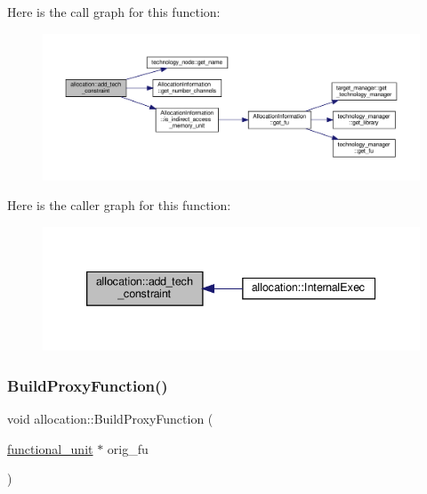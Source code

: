 Here is the call graph for this function\+:
\nopagebreak
\begin{figure}[H]
\begin{center}
\leavevmode
\includegraphics[width=350pt]{d0/d74/classallocation_a8896615bea432f94fc39ba9eb56f410c_cgraph}
\end{center}
\end{figure}
Here is the caller graph for this function\+:
\nopagebreak
\begin{figure}[H]
\begin{center}
\leavevmode
\includegraphics[width=339pt]{d0/d74/classallocation_a8896615bea432f94fc39ba9eb56f410c_icgraph}
\end{center}
\end{figure}
\mbox{\label{classallocation_a7e6e103d4874dd3126414e0f4d8bdd24}} 
\subsubsection{\texorpdfstring{Build\+Proxy\+Function()}{BuildProxyFunction()}}
{\footnotesize\ttfamily void allocation\+::\+Build\+Proxy\+Function (\begin{DoxyParamCaption}\item[{\hyperlink{structfunctional__unit}{functional\+\_\+unit} $\ast$}]{orig\+\_\+fu }\end{DoxyParamCaption})\hspace{0.3cm}{\ttfamily [protected]}}



